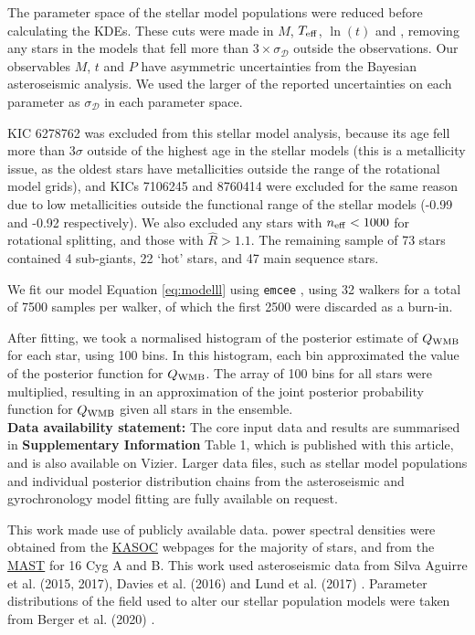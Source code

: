 The parameter space of the stellar model populations were reduced before calculating the KDEs. These cuts were made in $M$, $\mbox{$T_{\rm eff}$}$, $\ln(t)$ and \feh, removing any stars in the models that fell more than $3 \times \sigma_{\mathcal{D}}$ outside the observations. Our observables $M$, $t$ and $P$ have asymmetric uncertainties from the Bayesian asteroseismic analysis. We used the larger of the reported uncertainties on each parameter as $\sigma_{\mathcal{D}}$ in each parameter space. 

KIC 6278762 was excluded from this stellar model analysis, because its age fell more than $3\sigma$ outside of the highest age in the stellar models (this is a metallicity issue, as the oldest stars have metallicities outside the range of the rotational model grids), and KICs 7106245 and 8760414 were excluded for the same reason due to low metallicities outside the functional range of the stellar models (-0.99 and -0.92 respectively). We also excluded any stars with $n_{\rm eff} < 1000$ for rotational splitting, and those with $\hat{R} > 1.1$. The remaining sample of 73 stars contained 4 sub-giants, 22 `hot' stars, and 47 main sequence stars.

We fit our model Equation \ref{eq:modelll} using \texttt{emcee} \cite{foreman-mackey+2013, m_foreman-mackey2016}, using 32 walkers for a total of 7500 samples per walker, of which the first 2500 were discarded as a burn-in.

After fitting, we took a normalised histogram of the posterior estimate of $Q_{\rm WMB}$ for each star, using 100 bins. In this histogram, each bin approximated the value of the posterior function for $Q_{\rm WMB}$. The array of 100 bins for all stars were multiplied, resulting in an approximation of the joint posterior probability function for $Q_{\rm WMB}$ given all stars in the ensemble.\\



\textbf{Data availability statement:} The core input data and results are summarised in  \textbf{Supplementary Information} Table 1, which is published with this article, and is also available on Vizier. Larger data files, such as stellar model populations and individual posterior distribution chains from the asteroseismic and gyrochronology model fitting are fully available on request.

This work made use of publicly available data. \kepler power spectral densities were obtained from the \href{http://kasoc.phys.au.dk/}{KASOC} webpages for the majority of stars, and from the \href{https://archive.
		stsci.edu/prepds/kepseismic/}{MAST} for 16 Cyg A and B. This work used asteroseismic data from Silva Aguirre et al. (2015, 2017), Davies et al. (2016) and Lund et al. (2017) \cite{silvaaguirre+2015, m_silvaaguirre+2017,m_davies+2016, m_lund+2017}. Parameter distributions of the \kepler field used to alter our stellar population models were taken from Berger et al. (2020) \cite{berger+2020}.\\
	
